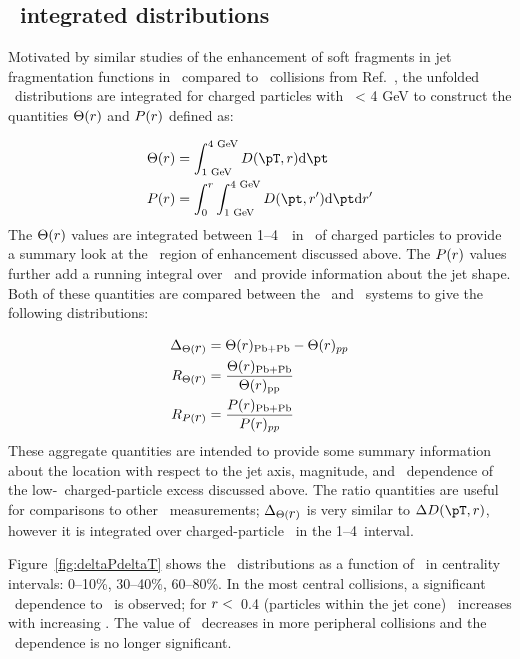 \subsection{\pt\ integrated distributions}
\label{sec:discussion_int}
Motivated by similar studies of the enhancement of soft fragments in 
jet fragmentation functions in \pbpb\ compared to \pp\ collisions from Ref.~\cite{Aaboud:2018hpb}, the unfolded \Dptr\ distributions are integrated for charged particles with \pt\ < 4 GeV to construct the quantities $\Theta(\mbox{$r$})$ and $P(\mbox{$r$})$ defined as:

\begin{align*}
   \Theta(\rvar) &= \int_{1 \text{ GeV}}^{4 \text{ GeV}} \Dptr  \fd \pt \\
   P(\rvar) &= \int_0^r \int_{1 \text{ GeV}}^{4 \text{ GeV}} D(\pt, r') \fd \pt \fd r'
\end{align*}
The $\Theta(\mbox{$r$})$ values are integrated between 1--4~\GeV\ in \pt\ of charged particles to provide a summary look at
the \pt\ region of enhancement discussed above.  The $P(\mbox{$r$})$ values further add a running integral over \rvar\
and provide information about the jet shape.
Both of these quantities are compared between the \pp\ and \pbpb\ systems to give the following distributions:

\begin{align*}
   \Delta_{\Theta(\mbox{$r$})} &= \Theta(\mbox{$r$})_{\mathrm{Pb+Pb}} - \Theta(\mbox{$r$})_{pp} \\
   R_{\Theta(\mbox{$r$})} &= \frac{\Theta(\mbox{$r$})_{\mathrm{Pb+Pb}}}{\Theta(\mbox{$r$})_{\mathrm{pp}}} \\
   R_{P(\mbox{$r$})} &= \frac{P(\mbox{$r$})_{\mathrm{Pb+Pb}}}{P(\mbox{$r$})_{pp}}
\end{align*}
These aggregate quantities are intended to provide some summary information about the location with respect to the 
jet axis, magnitude, and \ptjet\ dependence of the low-\pt\ charged-particle excess discussed above.
The ratio quantities are useful for comparisons to other \pbpb\ measurements; $\Delta_{\Theta(\mbox{$r$})}$ is very similar 
to $\DeltaDptr$, however it is integrated over charged-particle \pt\ in the 1--4~\GeV interval.

Figure~\ref{fig:deltaPdeltaT} shows the \DeltaTheta\ distributions as a function of \rvar\ in centrality intervals: 0--10\%, 30--40\%, 60--80\%.
In the most central collisions, a significant \ptjet\ dependence to \DeltaTheta\ is observed; for $\mbox{$r$} <$~0.4 (particles
within the jet cone) \DeltaTheta\ increases with increasing \ptjet.
The value of \DeltaTheta\ decreases in more peripheral collisions and the \ptjet\ dependence is no longer significant.

